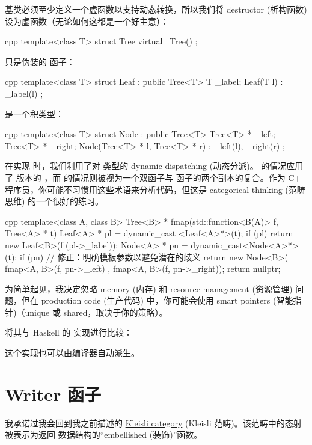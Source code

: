 基类必须至少定义一个虚函数以支持动态转换，所以我们将 destructor (析构函数) 设为虚函数（无论如何这都是一个好主意）：

\begin{snip}{cpp}
template<class T>
struct Tree {
    virtual ~Tree() {}
};
\end{snip}
 只是伪装的  函子：

\begin{snip}{cpp}
template<class T>
struct Leaf : public Tree<T> {
    T _label;
    Leaf(T l) : _label(l) {}
};
\end{snip}
 是一个积类型：

\begin{snip}{cpp}
template<class T>
struct Node : public Tree<T> {
    Tree<T> * _left;
    Tree<T> * _right;
    Node(Tree<T> * l, Tree<T> * r) : _left(l), _right(r) {}
};
\end{snip}
在实现  时，我们利用了对  类型的 dynamic dispatching (动态分派)。 的情况应用了  版本的 ，而  的情况则被视为一个双函子与  函子的两个副本的复合。作为 C++ 程序员，你可能不习惯用这些术语来分析代码，但这是 categorical thinking (范畴思维) 的一个很好的练习。

\begin{snip}{cpp}
template<class A, class B>
Tree<B> * fmap(std::function<B(A)> f, Tree<A> * t) {
    Leaf<A> * pl = dynamic_cast <Leaf<A>*>(t);
    if (pl)
        return new Leaf<B>(f (pl->_label));
    Node<A> * pn = dynamic_cast<Node<A>*>(t);
    if (pn)
        // 修正：明确模板参数以避免潜在的歧义
        return new Node<B>( fmap<A, B>(f, pn->_left) 
                          , fmap<A, B>(f, pn->_right)); 
    return nullptr;
}
\end{snip}
为简单起见，我决定忽略 memory (内存) 和 resource management (资源管理) 问题，但在 production code (生产代码) 中，你可能会使用 smart pointers (智能指针)（unique 或 shared，取决于你的策略）。

将其与 Haskell 的  实现进行比较：

这个实现也可以由编译器自动派生。

\section{Writer 函子}

我承诺过我会回到我之前描述的 \hyperref[kleisli-categories]{Kleisli category} (Kleisli 范畴)。该范畴中的态射被表示为返回  数据结构的“embellished (装饰)”函数。

